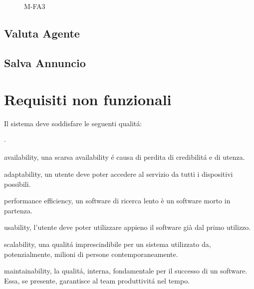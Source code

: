 \begin{figure}[h]
    \centering
    \caption{M-FA3}
    \label{fig:M-FA3}
\end{figure}

\subsection{Valuta Agente}


\subsection{Salva Annuncio}


\section{Requisiti non funzionali}
Il sistema deve soddisfare le seguenti qualitá:
\begin{list}{$\cdot$}{}
    \item availability, una scarsa availability é causa di perdita di 
    credibilitá e di utenza.
    \item adaptability, un utente deve poter accedere al servizio da tutti 
    i dispositivi possibili.
    \item performance efficiency, un software di ricerca lento è un software 
    morto in partenza.
    \item usability, l'utente deve poter utilizzare appieno il software già 
    dal primo utilizzo.
    \item scalability, una qualitá imprescindibile per un sistema utilizzato 
    da, potenzialmente, milioni di persone contemporaneamente.
    \item maintainability, la qualitá, interna, fondamentale per il successo 
    di un software. Essa, se presente, garantisce al team produttivitá nel tempo.
\end{list}


